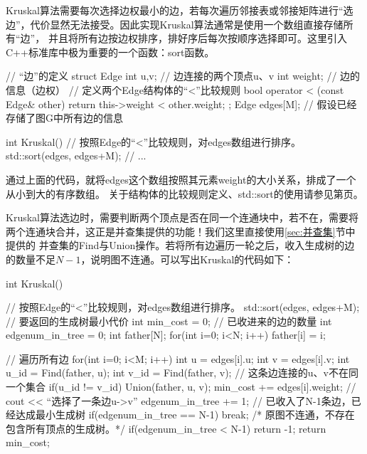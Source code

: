\label{minisec:Kruskal算法实现}
Kruskal算法需要每次选择边权最小的边，若每次遍历邻接表或邻接矩阵进行“选边”，代价显然无法接受。因此实现Kruskal算法通常是使用一个数组直接存储所有“边”，
并且将所有边按边权排序，排好序后每次按顺序选择即可。这里引入C++标准库中极为重要的一个函数：sort函数。

\begin{cppcode}
    // “边”的定义
    struct Edge {
        int u,v;    // 边连接的两个顶点u、v
        int weight; // 边的信息（边权）
        // 定义两个Edge结构体的“<”比较规则
        bool operator < (const Edge& other) {
            return this->weight < other.weight;
        }
    };
    Edge edges[M];  // 假设已经存储了图G中所有边的信息
    
    
    int Kruskal() {
        // 按照Edge的“<”比较规则，对edges数组进行排序。
        std::sort(edges, edges+M);
        // ...
    }
\end{cppcode}

通过上面的代码，就将edges这个数组按照其元素weight的大小关系，排成了一个从小到大的有序数组。
关于结构体的比较规则定义、std::sort的使用请参见第\pageref{sec:为结构体定义比较规则、std::sort()的使用}页。



Kruskal算法选边时，需要判断两个顶点是否在同一个连通块中，若不在，需要将两个连通块合并，这正是并查集提供的功能！我们这里直接使用\ref{sec:并查集}节中提供的
并查集的Find与Union操作。若将所有边遍历一轮之后，收入生成树的边的数量不足$N-1$，说明图不连通。可以写出Kruskal的代码如下：
\begin{cppcode}
    int Kruskal() {
        // 按照Edge的“<”比较规则，对edges数组进行排序。
        std::sort(edges, edges+M);
        // 要返回的生成树最小代价
        int min_cost = 0;
        // 已收进来的边的数量
        int edgenum_in_tree = 0;
        int father[N];
        for(int i=0; i<N; i++) {
            father[i] = i;
        }

        // 遍历所有边
        for(int i=0; i<M; i++) {
            int u = edges[i].u;
            int v = edges[i].v;
            int u_id = Find(father, u);
            int v_id = Find(father, v);
            // 这条边连接的u、v不在同一个集合
            if(u_id != v_id) {
                Union(father, u, v);
                min_cost += edges[i].weight;
                // cout << “选择了一条边u->v”
                edgenum_in_tree += 1;
                // 已收入了N-1条边，已经达成最小生成树
                if(edgenum_in_tree == N-1) {
                    break;
                }
            }
        }
        /* 原图不连通，不存在包含所有顶点的生成树。*/
        if(edgenum_in_tree < N-1) {
            return -1;
        }
        return min_cost;
    }
\end{cppcode}



